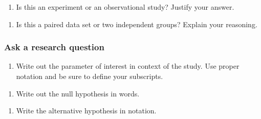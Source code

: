 \documentclass[
]{report}
\providecommand{\tightlist}{%
  \setlength{\itemsep}{0pt}\setlength{\parskip}{0pt}}
\begin{document}
\vspace{.4in}

\newpage

\begin{enumerate}
\def\labelenumi{\arabic{enumi}.}
\setcounter{enumi}{3}
\tightlist
\item
  Is this an experiment or an observational study? Justify your answer.
\end{enumerate}

\vspace{1in}

\begin{enumerate}
\def\labelenumi{\arabic{enumi}.}
\setcounter{enumi}{4}
\tightlist
\item
  Is this a paired data set or two independent groups? Explain your reasoning.
\end{enumerate}

\vspace{1in}

\hypertarget{ask-a-research-question-4}{%
\subsubsection*{Ask a research question}\label{ask-a-research-question-4}}

\begin{enumerate}
\def\labelenumi{\arabic{enumi}.}
\setcounter{enumi}{5}
\tightlist
\item
  Write out the parameter of interest in context of the study. Use proper notation and be sure to define your subscripts.
\end{enumerate}

\vspace{1in}

\begin{enumerate}
\def\labelenumi{\arabic{enumi}.}
\setcounter{enumi}{6}
\tightlist
\item
  Write out the null hypothesis in words.
\end{enumerate}

\vspace{1in}

\begin{enumerate}
\def\labelenumi{\arabic{enumi}.}
\setcounter{enumi}{7}
\tightlist
\item
  Write the alternative hypothesis in notation.
\end{enumerate}

\vspace{0.5in}
\end{document}
